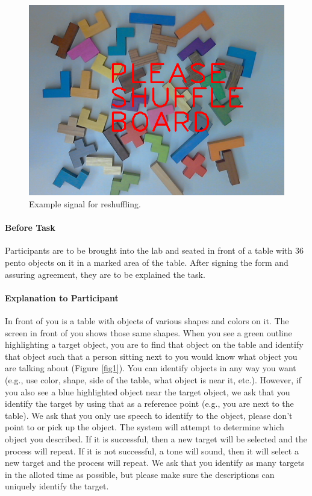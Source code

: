 \documentclass[a4paper,10pt]{article}
\begin{document}
\begin{figure}[ht]
\begin{minipage}{0.3\linewidth}
\centering
      \includegraphics[width=1.0\textwidth]{shuffle.png}	
      \caption{Example signal for reshuffling.\label{fig3}}
\end{minipage}
\end{figure}

\paragraph{Before Task} Participants are to be brought into the lab and seated in front of a table with 36 pento objects on it in a marked area of the table. After signing the form and assuring agreement, they are to be explained the task. 

\paragraph{Explanation to Participant} In front of you is a table with objects of various shapes and colors on it. The screen in front of you shows those same shapes. When you see a green outline highlighting a target object, you are to find that object on the table and identify that object such that a person sitting next to you would know what object you are talking about (Figure \ref{fig1}). You can identify objects in any way you want (e.g., use color, shape, side of the table, what object is near it, etc.). However, if you also see a blue highlighted object near the target object, we ask that you identify the target by using that as a reference point (e.g., you are next to the table). We ask that you only use speech to identify to the object, please don't point to or pick up the object. The system will attempt to determine which object you described. If it is successful, then  a new target will be selected and the process will repeat. If it is not successful, a tone will sound, then it will select a new target and the process will repeat. We ask that you identify as many targets in the alloted time as possible, but please make sure the descriptions can uniquely identify the target.
\end{document}
